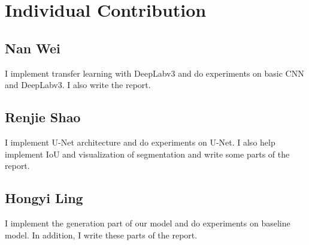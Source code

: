 \documentclass{article} %
\begin{document}
\section{Individual Contribution}

\subsection*{Nan Wei}
I implement transfer learning with DeepLabv3 and do experiments on basic CNN and DeepLabv3. I also write the report.

\subsection*{Renjie Shao}
I implement U-Net architecture and do experiments on U-Net. I also help implement IoU and visualization of segmentation and write some parts of the report.
\subsection*{Hongyi Ling}
I implement the generation part of our model and do experiments on baseline model.  In addition, I write these parts of the report.



\end{document}
